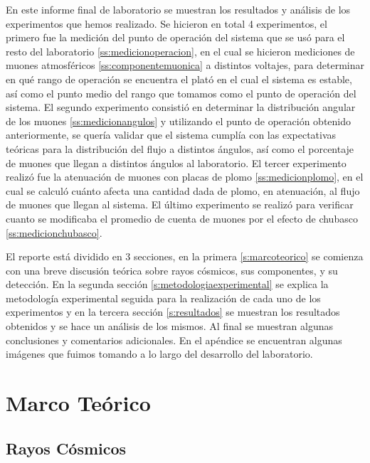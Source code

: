 \documentclass[a4paper,10pt]{article}
\numberwithin{equation}{section}
\begin{document}
\vspace{.3cm}

En este informe final de laboratorio se muestran los resultados y análisis 
de los experimentos que hemos realizado. Se hicieron en total 4 experimentos, 
el primero fue la medición del punto de operación del sistema que se usó 
para el resto del laboratorio \eqref{ss:medicionoperacion}, en el cual se hicieron mediciones de muones atmosféricos 
\eqref{ss:componentemuonica} a distintos voltajes, para determinar en qué rango 
de operación se encuentra el plató en el cual el sistema es estable, así como 
el punto medio del rango que tomamos como el punto de operación del sistema. El segundo experimento 
consistió en determinar la distribución angular de los muones \eqref{ss:medicionangulos} y utilizando 
el punto de operación obtenido anteriormente, se quería validar que el sistema 
cumplía con las expectativas teóricas para la distribución del flujo a distintos 
ángulos, así como el porcentaje de muones que llegan a distintos ángulos al 
laboratorio. El tercer experimento realizó fue la atenuación de muones con 
placas de plomo \eqref{ss:medicionplomo}, en el cual se calculó cuánto afecta una cantidad dada 
de plomo, en atenuación, al flujo de muones que llegan al sistema. El último experimento 
se realizó para verificar cuanto se modificaba el promedio de cuenta de muones por el 
efecto de chubasco \eqref{ss:medicionchubasco}.

\vspace{.3cm}

El reporte está dividido en 3 secciones, en la primera \eqref{s:marcoteorico} se comienza con una breve discusión 
teórica sobre rayos cósmicos, sus componentes, y su detección. En la segunda sección 
\eqref{s:metodologiaexperimental} se explica la metodología experimental seguida para la realización de cada uno de los 
experimentos y en la tercera sección \eqref{s:resultados} se muestran los resultados obtenidos y se 
hace un análisis de los mismos. Al final se muestran algunas conclusiones y comentarios 
adicionales. En el apéndice se encuentran algunas imágenes que fuimos tomando a lo 
largo del desarrollo del laboratorio.

\newpage

\section{Marco Teórico}
\label{s:marcoteorico}

\subsection{Rayos Cósmicos}
\end{document}
